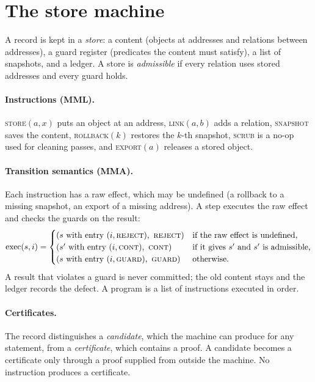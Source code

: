 \section{The store machine}\label{sec:machine}

A record is kept in a \emph{store}: a content (objects at addresses and relations between addresses), a guard register (predicates the
content must satisfy), a list of snapshots, and a ledger.  A store is \emph{admissible} if every relation uses stored addresses and every
guard holds.

\paragraph{Instructions (MML).}  \textsc{store}\((a,x)\) puts an object at an address, \textsc{link}\((a,b)\) adds a relation,
\textsc{snapshot} saves the content, \textsc{rollback}\((k)\) restores the \(k\)-th snapshot, \textsc{scrub} is a no-op used for cleaning
passes, and \textsc{export}\((a)\) releases a stored object.

\paragraph{Transition semantics (MMA).}  Each instruction has a raw effect, which may be undefined (a rollback to a missing snapshot, an
export of a missing address).  A step executes the raw effect and checks the guards on the result:
\[
\mathrm{exec}(s,i)=\begin{cases}
(s\ \text{with entry } (i,\textsc{reject}),\ \textsc{reject}) & \text{if the raw effect is undefined},\\
(s'\ \text{with entry } (i,\textsc{cont}),\ \textsc{cont}) & \text{if it gives } s' \text{ and } s' \text{ is admissible},\\
(s\ \text{with entry } (i,\textsc{guard}),\ \textsc{guard}) & \text{otherwise.}
\end{cases}
\]
A result that violates a guard is never committed; the old content stays and the ledger records the defect.  A program is a list of
instructions executed in order.

\paragraph{Certificates.}  The record distinguishes a \emph{candidate}, which the machine can produce for any statement, from a
\emph{certificate}, which contains a proof.  A candidate becomes a certificate only through a proof supplied from outside the machine.  No
instruction produces a certificate.
